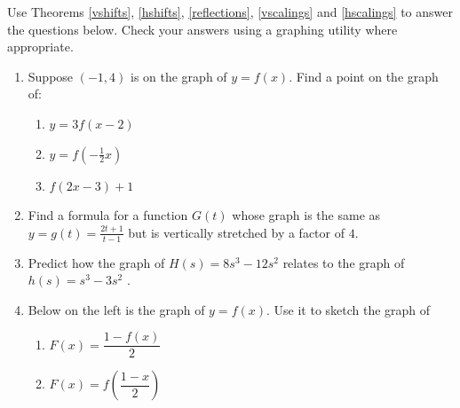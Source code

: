 \begin{ex}  \label{scalingsex} 


Use Theorems  \ref{vshifts},  \ref{hshifts}, \ref{reflections}, \ref{vscalings} and \ref{hscalings}  to answer the questions below.  Check your answers using a graphing utility where appropriate.
 
 \begin{enumerate}
 
 \item   Suppose $(-1,4)$ is on the graph of $y = f(x)$.  Find a point on the graph of:
 
 \begin{multicols}{3}
 
 \begin{enumerate}
 
 \item $y = 3f(x-2)$
 
 \item $y = f\left(-\frac{1}{2} x \right)$
 
 \item  $f(2x-3)+1$
 
 \end{enumerate}
 
 \end{multicols}
 
 \item  Find a formula for a function $G(t)$ whose graph is the same as $y=g(t) = \frac{2t+1}{t-1}$ but is vertically stretched by a factor of $4$.
  
 \item Predict how the graph of $H(s) = 8s^3 - 12s^2$ relates to the graph of $h(s) = s^3-3s^2$ . 
 
\item  Below on the left is the graph of $y = f(x)$.  Use it to sketch the graph of

  \begin{multicols}{2}
 
 \begin{enumerate}
 
 \item $F(x) = \dfrac{1-f(x)}{2}$
 
  \item  $F(x)= f\left( \dfrac{1-x}{2} \right)$
 
 \end{enumerate}
 
 \end{multicols}
 
 \enlargethispage{0.25in}
 

\end{enumerate}
\end{ex}
